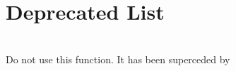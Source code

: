 \chapter{Deprecated List }
\hypertarget{deprecated}{}\label{deprecated}

\begin{DoxyRefList}
\item[{\parbox[t]{\linewidth}{Member \doxylink{group__rtc_gaf7009d11f7eeed9f5bc0a2c3249c0ea8}{RTC\+\_\+\+Set\+Clock\+Source} (\doxylink{structRTC__Type}{RTC\+\_\+\+Type} \texorpdfstring{$\ast$}{*}base)}}]\hfill \\
\label{deprecated__deprecated000001}%
%
Do not use this function. It has been superceded by 
\end{DoxyRefList}